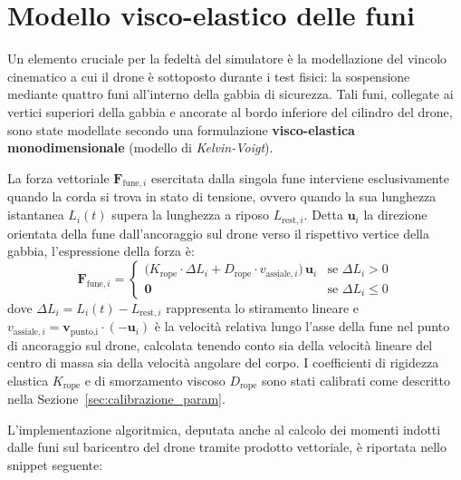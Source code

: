 \documentclass[11pt]{report}
\begin{document}
	\section{Modello visco-elastico delle funi}
	\label{sec:modello_funi}
	
	Un elemento cruciale per la fedeltà del simulatore è la modellazione del vincolo cinematico a cui il drone è sottoposto durante i test fisici: la sospensione mediante quattro funi all'interno della gabbia di sicurezza. Tali funi, collegate ai vertici superiori della gabbia e ancorate al bordo inferiore del cilindro del drone, sono state modellate secondo una formulazione \textbf{visco-elastica monodimensionale} (modello di \textit{Kelvin-Voigt}).
	
	La forza vettoriale $\mathbf{F}_{\text{fune},i}$ esercitata dalla singola fune interviene esclusivamente quando la corda si trova in stato di tensione, ovvero quando la sua lunghezza istantanea $L_i(t)$ supera la lunghezza a riposo $L_{\text{rest},i}$. Detta $\mathbf{u}_i$ la direzione orientata della fune dall'ancoraggio sul drone verso il rispettivo vertice della gabbia, l'espressione della forza è:
	\begin{equation}
		\mathbf{F}_{\text{fune},i} =
		\begin{cases}
			\bigl( K_\text{rope} \cdot \Delta L_i + D_\text{rope} \cdot v_{\text{assiale},i} \bigr) \, \mathbf{u}_i & \text{se } \Delta L_i > 0 \\
			\mathbf{0} & \text{se } \Delta L_i \leq 0
		\end{cases}
		\label{eq:forza_fune}
	\end{equation}
	dove $\Delta L_i = L_i(t) - L_{\text{rest},i}$ rappresenta lo stiramento lineare e $v_{\text{assiale},i} = \mathbf{v}_\text{punto,i} \cdot (-\mathbf{u}_i)$ è la velocità relativa lungo l'asse della fune nel punto di ancoraggio sul drone, calcolata tenendo conto sia della velocità lineare del centro di massa sia della velocità angolare del corpo. I coefficienti di rigidezza elastica $K_\text{rope}$ e di smorzamento viscoso $D_\text{rope}$ sono stati calibrati come descritto nella Sezione~\ref{sec:calibrazione_param}.
	
	L'implementazione algoritmica, deputata anche al calcolo dei momenti indotti dalle funi sul baricentro del drone tramite prodotto vettoriale, è riportata nello snippet seguente:
	
\end{document}
